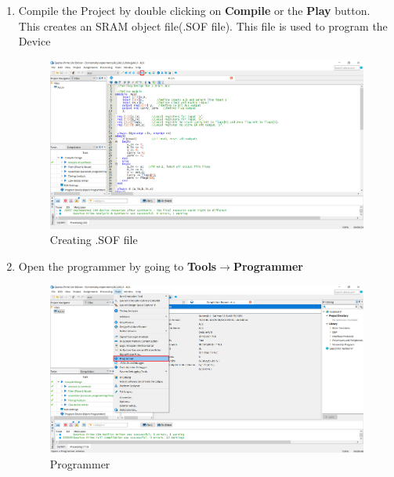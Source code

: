 \documentclass[12pt,singleside,a4paper]{article}
\begin{document}
 \begin{enumerate}
     \item Compile the Project by double clicking on \textbf{Compile} or the \textbf{Play} button. This creates an SRAM object file(.SOF file). This file is used to program the Device
     \begin{figure}[H]
         \centering
         \includegraphics[width=14cm,keepaspectratio]{soffile.png}
     \caption{Creating .SOF file}
     \end{figure}
     
     \item Open the programmer by going to \textbf{Tools}$\rightarrow$\textbf{Programmer}
     \begin{figure}[H]
         \centering
         \includegraphics[width=14cm,keepaspectratio]{download2.png}
     \caption{Programmer}
     \end{figure}
     \newpage
     

\end{enumerate}
\end{document}
